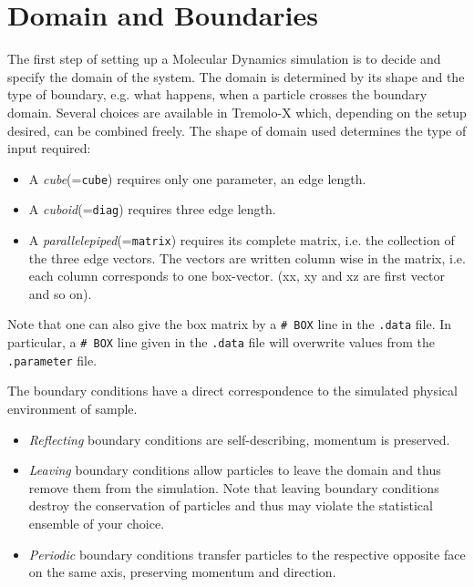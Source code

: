 \chapter{Domain and Boundaries}
\label{domain}

The first step of setting up a Molecular Dynamics simulation is to decide and specify the domain of the system. The domain is determined by its shape and the type of boundary, e.g. what happens, when a particle crosses the boundary domain. Several choices are available in Tremolo-X which, depending on the setup desired, can be combined freely.
The shape of domain used determines the type of input required: 

\begin{itemize}
 \item A \textit{cube}(={\tt cube}) requires only one parameter, an edge length.
\item A \textit{cuboid}(={\tt diag}) requires three edge length.
\item A \textit{parallelepiped}(={\tt matrix}) requires its complete matrix, i.e. the collection of the three edge vectors. The vectors are written column wise in the matrix, i.e. each column corresponds to one box-vector. (xx, xy and xz are first vector and so on).
\end{itemize}

Note that one can also give the box matrix by a \texttt{\# BOX} line
in the \texttt{.data} file. In particular, a \texttt{\# BOX} line
given in the \texttt{.data} file will overwrite values from the
\texttt{.parameter} file.

\bigbreak

The boundary conditions have a direct correspondence to the simulated physical environment of sample.
\begin{itemize}
 \item \textit{Reflecting} boundary conditions are self-describing, momentum is preserved. %
 \item \textit{Leaving} boundary conditions allow particles to leave the domain and thus remove them from the simulation. Note that leaving boundary conditions destroy the conservation of particles and thus may violate the statistical ensemble of your choice.
 \item \textit{Periodic} boundary conditions transfer particles to the respective opposite face on the same axis, preserving momentum and direction.
\end{itemize}
